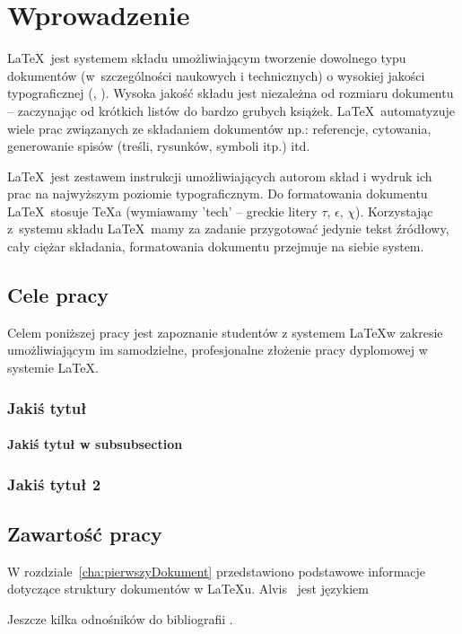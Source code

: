 \chapter{Wprowadzenie}
\label{cha:wprowadzenie}

\LaTeX~jest systemem składu umożliwiającym tworzenie dowolnego typu dokumentów (w~szczególności naukowych i technicznych) o wysokiej jakości typograficznej (\cite{Dil00}, \cite{Lam92}). Wysoka jakość składu jest niezależna od rozmiaru dokumentu -- zaczynając od krótkich listów do bardzo grubych książek. \LaTeX~automatyzuje wiele prac związanych ze składaniem dokumentów np.: referencje, cytowania, generowanie spisów (treśli, rysunków, symboli itp.) itd.

\LaTeX~jest zestawem instrukcji umożliwiających autorom skład i wydruk ich prac na najwyższym poziomie typograficznym. Do formatowania dokumentu \LaTeX~stosuje \TeX a (wymiawamy 'tech' -- greckie litery $\tau$, $\epsilon$, $\chi$). Korzystając z~systemu składu \LaTeX~mamy za zadanie przygotować jedynie tekst źródłowy, cały ciężar składania, formatowania dokumentu przejmuje na siebie system.


\section{Cele pracy}
\label{sec:celePracy}


Celem poniższej pracy jest zapoznanie studentów z systemem \LaTeX w zakresie umożliwiającym im samodzielne, profesjonalne złożenie pracy dyplomowej w systemie \LaTeX.

\subsection{Jakiś tytuł}

\subsubsection{Jakiś tytuł w subsubsection}


\subsection{Jakiś tytuł 2}


\section{Zawartość pracy}
\label{sec:zawartoscPracy}

W rozdziale~\ref{cha:pierwszyDokument} przedstawiono podstawowe informacje dotyczące struktury dokumentów w \LaTeX u. Alvis~\cite{Alvis2011} jest językiem\textellipsis

Jeszcze kilka odnośników do bibliografii \cite{PeDa04,BuDo03}.
